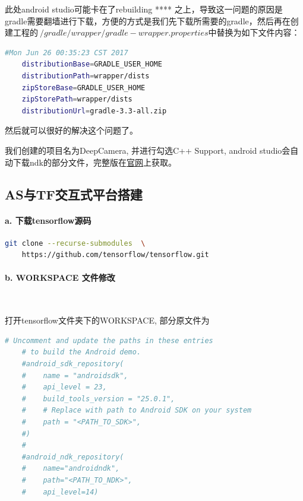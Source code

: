 \documentclass[UTF8, Microsoft YaHei]{book}
\begin{document}
    此处android studio可能卡在了rebuilding **** 之上，导致这一问题的原因是gradle需要翻墙进行下载，方便的方式是我们先下载所需要的gradle，然后再在创建工程的$~/gradle/wrapper/gradle-wrapper.properties$中替换为如下文件内容：

    \begin{lstlisting}[language=bash]
    #Mon Jun 26 00:35:23 CST 2017
    distributionBase=GRADLE_USER_HOME
    distributionPath=wrapper/dists
    zipStoreBase=GRADLE_USER_HOME
    zipStorePath=wrapper/dists
    distributionUrl=gradle-3.3-all.zip
    \end{lstlisting}

    然后就可以很好的解决这个问题了。

    我们创建的项目名为DeepCamera, 并进行勾选C++ Support, android studio会自动下载ndk的部分文件，完整版在\href{https://developer.android.com/ndk/downloads/index.html}{官网}上获取。

    \subsection{AS与TF交互式平台搭建}
    \paragraph{a. 下载tensorflow源码}

    \begin{lstlisting}[language=bash]
    git clone --recurse-submodules  \
    https://github.com/tensorflow/tensorflow.git
    \end{lstlisting}

    \paragraph{b. WORKSPACE 文件修改}

    ~

    打开tensorflow文件夹下的WORKSPACE, 部分原文件为

    \begin{lstlisting}[language=bash]
    # Uncomment and update the paths in these entries
    # to build the Android demo.
    #android_sdk_repository(
    #    name = "androidsdk",
    #    api_level = 23,
    #    build_tools_version = "25.0.1",
    #    # Replace with path to Android SDK on your system
    #    path = "<PATH_TO_SDK>",
    #)
    #
    #android_ndk_repository(
    #    name="androidndk",
    #    path="<PATH_TO_NDK>",
    #    api_level=14)
    \end{lstlisting}
\end{document}
